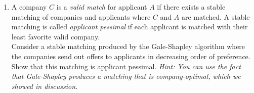 \documentclass[11pt,letterpaper]{report}
\begin{document}
\begin{enumerate}
\begin{enumerate}
		\item A company $C$ is a \textit{valid match} for applicant $A$ if there exists a stable matching of companies and applicants where $C$ and $A$ are matched. A stable matching is called \textit{applicant pessimal} if each applicant is matched with their least favorite valid company.\\
		\noindent Consider a stable matching produced by the Gale-Shapley algorithm where the companies send out offers to applicants in decreasing order of preference. Show that this matching is applicant pessimal. \textit{Hint: You can use the fact that Gale-Shapley produces a matching that is company-optimal, which we showed in discussion.}
	\end{enumerate}
	\vfill
\end{enumerate}
\end{document}
